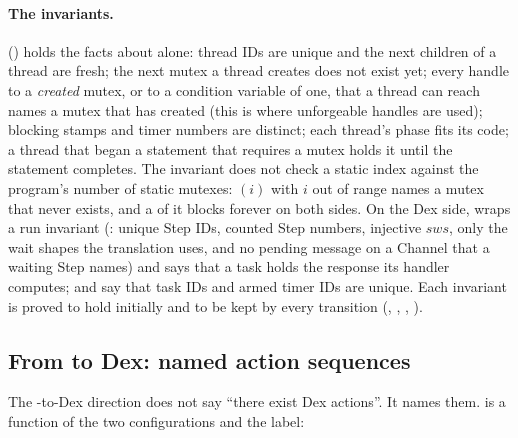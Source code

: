 \paragraph{The invariants.}
 () holds the facts about \Lang{}
alone: thread IDs are unique and the next children of a thread are fresh;
the next mutex a thread creates does not exist yet; every handle to a
\emph{created} mutex, or to a condition variable of one, that a thread
can reach names a mutex that  has created (this is where
unforgeable handles are used);
blocking stamps and timer numbers are distinct; each thread's phase
fits its code; a thread that began a statement that requires a mutex holds
it until the statement completes. The invariant does not check a static
index against the program's number of static mutexes:
$(i)$ with $i$ out of range names a mutex that never
exists, and a  of it blocks forever on both sides. On the Dex
side,
 wraps a run invariant (:
unique Step IDs, counted Step numbers, injective $\mathit{sws}$, only the
wait shapes the translation uses, and no pending message on a Channel that
a waiting Step names) and says that a task holds the response its handler
computes;  and  say
that task IDs and armed timer IDs are unique. Each invariant is proved to
hold initially and to be kept by every transition
(, ,
, ).

\subsection{From \Lang{} to Dex: named action sequences}
\label{sec:ltodex}

The \Lang{}-to-Dex direction does not say ``there exist Dex actions''. It
names them.  is a function of the two
configurations and the \Lang{} label:


